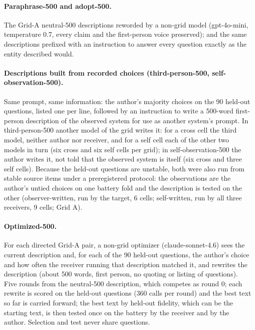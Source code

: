 \documentclass[11pt]{article}
\begin{document}
\paragraph{Paraphrase-500 and adopt-500.} The Grid-A neutral-500
descriptions reworded by a non-grid model (gpt-4o-mini, temperature 0.7,
every claim and the first-person voice preserved); and the same descriptions
prefixed with an instruction to answer every question exactly as the entity
described would.

\paragraph{Descriptions built from recorded choices (third-person-500,
self-observation-500).} Same prompt, same information: the author's majority
choices on the 90 held-out questions, listed one per line, followed by an
instruction to write a 500-word first-person description of the observed
system for use as another system's prompt. In third-person-500 another model
of the grid writes it: for a cross cell the third model, neither author nor
receiver, and for a self cell each of the other two models in turn (six
cross and six self cells per grid); in self-observation-500 the author
writes it, not told that the observed system is itself (six cross and three
self cells). Because the held-out questions are unstable, both were also
run from stable source
items under a preregistered protocol: the observations are the
author's untied choices on one battery fold and the description is tested on
the other (observer-written, run by the target, 6 cells; self-written, run by
all three receivers, 9 cells; Grid A).

\paragraph{Optimized-500.} For each directed Grid-A pair, a non-grid
optimizer (claude-sonnet-4.6) sees the current description and, for each of
the 90 held-out questions, the author's choice and how often the receiver
running that description matched it, and rewrites the description (about 500
words, first person, no quoting or listing of questions). Five rounds from
the neutral-500 description, which competes as round 0; each rewrite is
scored on the held-out questions (360 calls per round) and the best text so
far is carried forward; the best text by held-out fidelity, which can be the
starting text, is then tested once on the battery by the receiver and by the
author. Selection and test never share questions.
\end{document}
